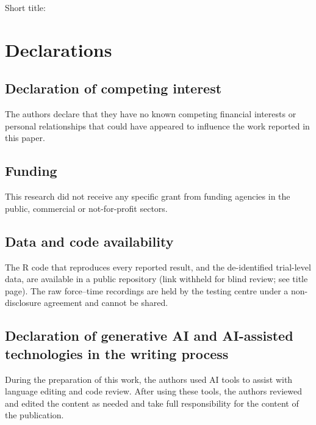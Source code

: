 \documentclass[12pt,a4paper]{article}
\begin{document}
\begin{onehalfspacing}
\begin{center}
{\Large\bfseries \papertitle\par}
\medskip
{\normalsize Short title: \shorttitle\par}
\end{center}
\medskip

\medskip

\end{onehalfspacing}
\clearpage
\doublespacing
\linenumbers

\nolinenumbers

\section*{Declarations}
\subsection*{Declaration of competing interest}
The authors declare that they have no known competing financial interests or personal relationships that could have appeared to influence the work reported in this paper.
\subsection*{Funding}
This research did not receive any specific grant from funding agencies in the public, commercial or not-for-profit sectors.
\subsection*{Data and code availability}
The R code that reproduces every reported result, and the de-identified trial-level data, are available in a public repository (link withheld for blind review; see title page). The raw force--time recordings are held by the testing centre under a non-disclosure agreement and cannot be shared.
\subsection*{Declaration of generative AI and AI-assisted technologies in the writing process}
During the preparation of this work, the authors used AI tools to assist with language editing and code review. After using these tools, the authors reviewed and edited the content as needed and take full responsibility for the content of the publication.

\singlespacing
\printbibliography
\end{document}
